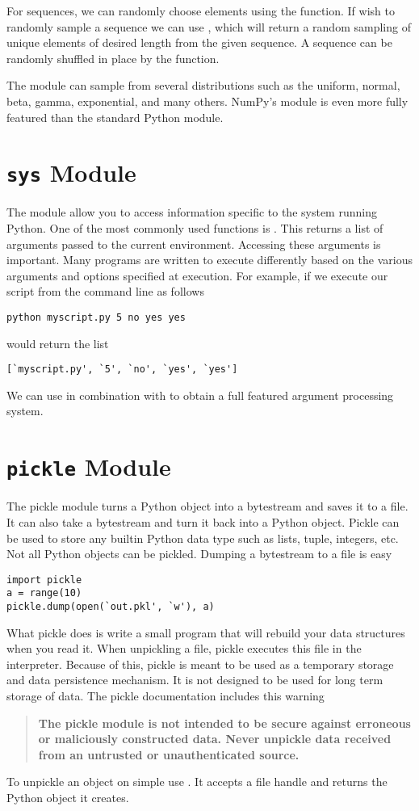 For sequences, we can randomly choose elements using the  function.  If wish to randomly sample a sequence we can use , which will return a random sampling of unique elements of desired length from the given sequence.  A sequence can be randomly shuffled in place by the  function.

The  module can sample from several distributions such as the uniform, normal, beta, gamma, exponential, and many others.  NumPy's  module is even more fully featured than the standard Python  module.

\section*{\texttt{sys} Module}
The  module allow you to access information specific to the system running Python.
One of the most commonly used functions is .  This returns a list of arguments passed to the current environment.  Accessing these arguments is important.  Many programs are written to execute differently based on the various arguments and options specified at execution.  For example, if we execute our script from the command line as follows
\begin{verbatim}
python myscript.py 5 no yes yes
\end{verbatim}
 would return the list
\begin{verbatim}
[`myscript.py', `5', `no', `yes', `yes']
\end{verbatim}
We can use  in combination with  to obtain a full featured argument processing system.

\section*{\texttt{pickle} Module}
The pickle module turns a Python object into a bytestream and saves it to a file.
It can also take a bytestream and turn it back into a Python object.
Pickle can be used to store any builtin Python data type such as lists, tuple, integers, etc.
Not all Python objects can be pickled.
Dumping a bytestream to a file is easy
\begin{lstlisting}
import pickle
a = range(10)
pickle.dump(open(`out.pkl', `w'), a)
\end{lstlisting}
What pickle does is write a small program that will rebuild your data structures when you read it.
When unpickling a file, pickle executes this file in the interpreter.  Because of this,
pickle is meant to be used as a temporary storage and data persistence mechanism.  It is not designed
to be used for long term storage of data.  The pickle documentation includes this warning
\begin{quote}
\textbf{The pickle module is not intended to be secure against erroneous or maliciously constructed data. Never unpickle data received from an untrusted or unauthenticated source.}
\end{quote}
To unpickle an object on simple use .  It accepts a file handle and returns the Python object it creates.

